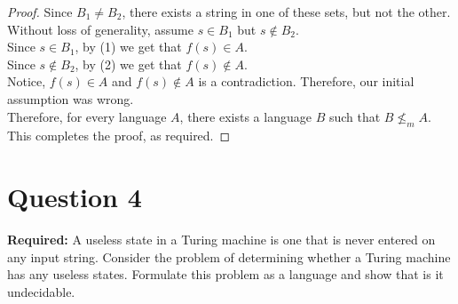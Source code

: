 \documentclass[12pt]{article}
\begin{document}
\begin{proof}
Since $B_1 \neq B_2$, there exists a string in one of these sets, but not the other. Without loss of generality, assume $s \in B_1$ but $s \not \in B_2$. \\

Since $s \in B_1$, by (1) we get that $f(s) \in A$. \\

Since $s \not \in B_2$, by (2) we get that $f(s) \not \in A$. \\

Notice, $f(s) \in A$ and $f(s) \not \in A$ is a contradiction. Therefore, our initial assumption was wrong. \\

Therefore, for every language $A$, there exists a language $B$ such that $B \not \leq_m A$. This completes the proof, as required. 
\end{proof}

\newpage

\section*{Question 4}

\textbf{Required:} A useless state in a Turing machine is one that is never entered on any input string. Consider the problem of determining whether a Turing machine has any useless states. Formulate this problem as a language and show that is it undecidable. 
\end{document}
